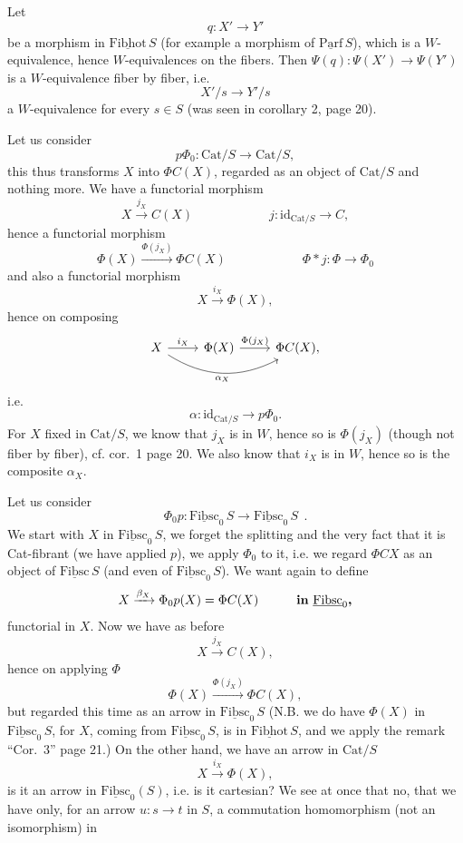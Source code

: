 \documentclass[11pt]{article}
\newcommand{\printedpage}[1]{\marginpar{\footnotesize p.~#1}}
\newcommand{\msp}[1]{\marginpar{\footnotesize [#1]}}
\newcommand{\und}[1]{\underline{\mathrm{#1}}}
\newcommand{\Cat}{\mathrm{Cat}}
\begin{document}
Let
\[ q : X' \longrightarrow Y' \]
be a morphism in $\und{Fibhot}\,S$ (for example a morphism of $\und{Parf}\,S$), which is a $W$-equivalence, hence $W$-equivalences on the fibers. Then $\Psi(q) : \Psi(X') \longrightarrow \Psi(Y')$ is a $W$-equivalence fiber by fiber, i.e.
\[ X'/s \longrightarrow Y'/s \]
a $W$-equivalence for every $s \in S$ (was seen in corollary 2, page 20).

\msp{page 29}
Let us consider
\[ p\Phi_0 : \Cat/S \longrightarrow \Cat/S, \]
this thus transforms $X$ into $\Phi C(X)$, regarded as an object of $\Cat/S$ and nothing more. We have a functorial morphism
\[ X \xrightarrow{j_X} C(X) \qquad\qquad\qquad j : \mathrm{id}_{\Cat/S} \longrightarrow C, \]
\printedpage{18}
hence a functorial morphism
\[ \Phi(X) \xrightarrow{\Phi(j_X)} \Phi C(X) \qquad\qquad\qquad \Phi * j : \Phi \longrightarrow \Phi_0 \]
and also a functorial morphism
\[ X \xrightarrow{i_X} \Phi(X), \]
hence on composing
\[
\begin{tikzcd}
X \arrow[r, "i_X"] \arrow[rr, bend right, "\alpha_X"'] & \Phi(X) \arrow[r, "\Phi(j_X)"] & \Phi C(X),
\end{tikzcd}
\]
i.e.
\[ \alpha : \mathrm{id}_{\Cat/S} \longrightarrow p\Phi_0. \]
For $X$ fixed in $\Cat/S$, we know that $j_X$ is in $W$, hence so is $\Phi(j_X)$ (though not fiber by fiber), cf. cor.~1 page 20. We also know that $i_X$ is in $W$, hence so is the composite $\alpha_X$.

Let us consider
\[ \Phi_0 p : \und{Fibsc}_0\,S \longrightarrow \und{Fibsc}_0\,S\ \ . \]
We start with $X$ in $\und{Fibsc}_0\,S$, we forget the splitting and the very fact that it is Cat-fibrant
\msp{page 30}
(we have applied $p$), we apply $\Phi_0$ to it, i.e. we regard $\Phi CX$ as an object of $\und{Fibsc}\,S$ (and even of $\und{Fibsc}_0\,S$). We want again to define
\[ X \xrightarrow{\beta_X} \Phi_0 p(X) = \Phi C(X) \qquad\quad \text{\textbf{in} } \und{Fibsc}_0\text{\textbf{,}} \] %
functorial in $X$. Now we have as before
\[ X \xrightarrow{j_X} C(X), \]
hence on applying $\Phi$
\[ \Phi(X) \xrightarrow{\Phi(j_X)} \Phi C(X), \]
but regarded this time as an arrow in $\und{Fibsc}_0\,S$ (N.B. we do have $\Phi(X)$ in $\und{Fibsc}_0\,S$, for $X$, coming from $\und{Fibsc}_0\,S$, is in $\und{Fibhot}\,S$, and we apply the remark ``Cor.~3'' page 21.) On the other hand, we have an arrow in $\Cat/S$
\[ X \xrightarrow{i_X} \Phi(X), \]
is it an arrow in $\und{Fibsc}_0(S)$, i.e. is it cartesian? We see at once that no, that we have only, for an arrow $u : s \longrightarrow t$ in $S$, a commutation homomorphism (not an isomorphism) in
\end{document}
